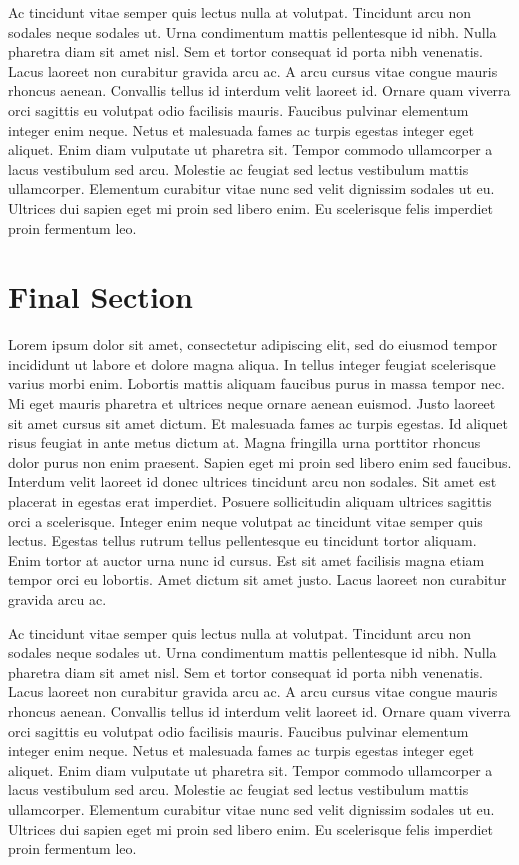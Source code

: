 \documentclass{ledger}
\begin{document}
Ac tincidunt vitae semper quis lectus nulla at volutpat. Tincidunt arcu non sodales neque sodales ut. Urna condimentum mattis pellentesque id nibh. Nulla pharetra diam sit amet nisl. Sem et tortor consequat id porta nibh venenatis. Lacus laoreet non curabitur gravida arcu ac. A arcu cursus vitae congue mauris rhoncus aenean. Convallis tellus id interdum velit laoreet id. Ornare quam viverra orci sagittis eu volutpat odio facilisis mauris. Faucibus pulvinar elementum integer enim neque. Netus et malesuada fames ac turpis egestas integer eget aliquet. Enim diam vulputate ut pharetra sit. Tempor commodo ullamcorper a lacus vestibulum sed arcu. Molestie ac feugiat sed lectus vestibulum mattis ullamcorper. Elementum curabitur vitae nunc sed velit dignissim sodales ut eu. Ultrices dui sapien eget mi proin sed libero enim. Eu scelerisque felis imperdiet proin fermentum leo.\newline



\section{Final Section}

Lorem ipsum dolor sit amet, consectetur adipiscing elit, sed do eiusmod tempor incididunt ut labore et dolore magna aliqua. In tellus integer feugiat scelerisque varius morbi enim. Lobortis mattis aliquam faucibus purus in massa tempor nec. Mi eget mauris pharetra et ultrices neque ornare aenean euismod. Justo laoreet sit amet cursus sit amet dictum. Et malesuada fames ac turpis egestas. Id aliquet risus feugiat in ante metus dictum at. Magna fringilla urna porttitor rhoncus dolor purus non enim praesent. Sapien eget mi proin sed libero enim sed faucibus. Interdum velit laoreet id donec ultrices tincidunt arcu non sodales. Sit amet est placerat in egestas erat imperdiet. Posuere sollicitudin aliquam ultrices sagittis orci a scelerisque. Integer enim neque volutpat ac tincidunt vitae semper quis lectus. Egestas tellus rutrum tellus pellentesque eu tincidunt tortor aliquam. Enim tortor at auctor urna nunc id cursus. Est sit amet facilisis magna etiam tempor orci eu lobortis. Amet dictum sit amet justo. Lacus laoreet non curabitur gravida arcu ac.

Ac tincidunt vitae semper quis lectus nulla at volutpat. Tincidunt arcu non sodales neque sodales ut. Urna condimentum mattis pellentesque id nibh. Nulla pharetra diam sit amet nisl. Sem et tortor consequat id porta nibh venenatis. Lacus laoreet non curabitur gravida arcu ac. A arcu cursus vitae congue mauris rhoncus aenean. Convallis tellus id interdum velit laoreet id. Ornare quam viverra orci sagittis eu volutpat odio facilisis mauris. Faucibus pulvinar elementum integer enim neque. Netus et malesuada fames ac turpis egestas integer eget aliquet. Enim diam vulputate ut pharetra sit. Tempor commodo ullamcorper a lacus vestibulum sed arcu. Molestie ac feugiat sed lectus vestibulum mattis ullamcorper. Elementum curabitur vitae nunc sed velit dignissim sodales ut eu. Ultrices dui sapien eget mi proin sed libero enim. Eu scelerisque felis imperdiet proin fermentum leo.
\end{document}
